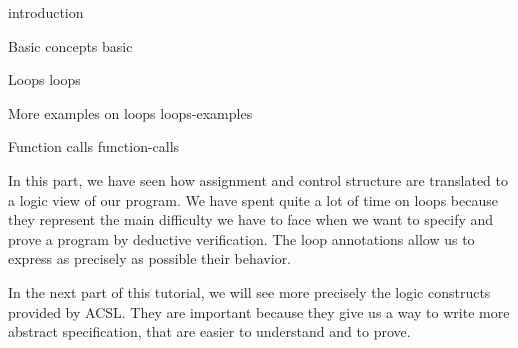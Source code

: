 \begin{levelTwo}
  {}
  {introduction}
\end{levelTwo}

\begin{levelTwo}
  {Basic concepts}
  {basic}
\end{levelTwo}

\begin{levelTwo}
  {Loops}
  {loops}
\end{levelTwo}

\begin{levelTwo}
  {More examples on loops}
  {loops-examples}
\end{levelTwo}

\begin{levelTwo}
  {Function calls}
  {function-calls}
\end{levelTwo}

\horizontalLine
\newpage


In this part, we have seen how assignment and control structure are translated
to a logic view of our program. We have spent quite a lot of time on loops
because they represent the main difficulty we have to face when we want to
specify and prove a program by deductive verification. The loop annotations
allow us to express as precisely as possible their behavior.



In the next part of this tutorial, we will see more precisely the logic
constructs provided by ACSL. They are important because they give us a way to
write more abstract specification, that are easier to understand and to prove.
